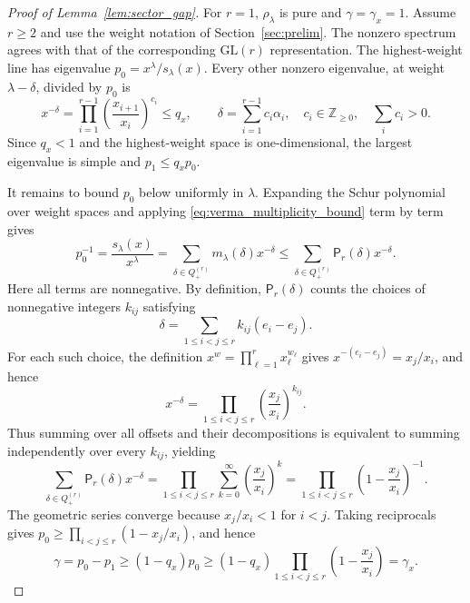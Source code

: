 \documentclass[a4paper,onecolumn,11pt]{quantumarticle}
\begin{document}
\begin{proof}[Proof of Lemma~\ref{lem:sector_gap}]
For $r=1$, $\rho_\lambda$ is pure and $\gamma=\gamma_x=1$.
Assume $r\ge2$ and use the weight notation of
Section~\ref{sec:prelim}. The nonzero spectrum agrees with that of
the corresponding $\mathrm{GL}(r)$ representation. The highest-weight
line has eigenvalue $p_0=x^\lambda/s_\lambda(x)$. Every other
nonzero eigenvalue, at weight $\lambda-\delta$, divided by $p_0$ is
\[
x^{-\delta}
=\prod_{i=1}^{r-1}\left(\frac{x_{i+1}}{x_i}\right)^{c_i}
\le q_x,
\qquad
\delta=\sum_{i=1}^{r-1}c_i\alpha_i,\quad
c_i\in\mathbb Z_{\ge0},\quad \sum_i c_i>0.
\]
Since $q_x<1$ and the highest-weight space is one-dimensional,
the largest eigenvalue is simple and $p_1\le q_xp_0$.

It remains to bound $p_0$ below uniformly in $\lambda$.
Expanding the Schur polynomial over weight spaces and applying
\eqref{eq:verma_multiplicity_bound} term by term gives
\[
p_0^{-1}=\frac{s_\lambda(x)}{x^\lambda}
=\sum_{\delta\in Q_+^{(r)}}m_\lambda(\delta)x^{-\delta}
\le\sum_{\delta\in Q_+^{(r)}}\mathsf P_r(\delta)x^{-\delta}.
\]
Here all terms are nonnegative. By definition,
$\mathsf P_r(\delta)$ counts the choices of nonnegative integers
$k_{ij}$ satisfying
\[
\delta=\sum_{1\le i<j\le r}k_{ij}(e_i-e_j).
\]
For each such choice, the definition $x^w=\prod_{\ell=1}^r x_\ell^{w_\ell}$
gives $x^{-(e_i-e_j)}=x_j/x_i$, and hence
\[
x^{-\delta}=\prod_{1\le i<j\le r}
\left(\frac{x_j}{x_i}\right)^{k_{ij}}.
\]
Thus summing over all offsets and their decompositions is equivalent
to summing independently over every $k_{ij}$, yielding
\[
\sum_{\delta\in Q_+^{(r)}}\mathsf P_r(\delta)x^{-\delta}
=\prod_{1\le i<j\le r}\sum_{k=0}^{\infty}
\left(\frac{x_j}{x_i}\right)^k
=\prod_{1\le i<j\le r}\left(1-\frac{x_j}{x_i}\right)^{-1}.
\]
The geometric series converge because $x_j/x_i<1$ for $i<j$.
Taking reciprocals gives
$p_0\ge\prod_{i<j\le r}(1-x_j/x_i)$, and hence
\[
\gamma=p_0-p_1\ge(1-q_x)p_0
\ge(1-q_x)\prod_{1\le i<j\le r}
\left(1-\frac{x_j}{x_i}\right)=\gamma_x.
\]
\end{proof}
\end{document}
